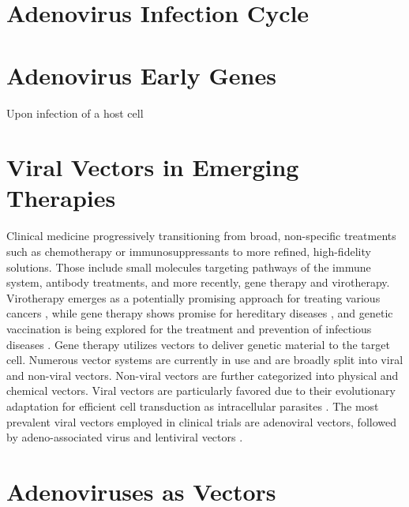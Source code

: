 \section{Adenovirus Infection Cycle}



\section{Adenovirus Early Genes}

Upon infection of a host cell


\section{Viral Vectors in Emerging Therapies}

Clinical medicine progressively transitioning from broad, non-specific treatments such as chemotherapy or immunosuppressants to more refined, high-fidelity solutions. Those include small molecules targeting pathways of the immune system, antibody treatments, and more recently, gene therapy and virotherapy. Virotherapy emerges as a potentially promising approach for treating various cancers \cite{xiaoOncolyticVirusesAdvanced2026}, while gene therapy shows promise for hereditary diseases \cite{shchaslyvyiCurrentStateHuman2023}, and genetic vaccination is being explored for the treatment and prevention of infectious diseases \cite{zhouDNABasedVaccinesAdvances2026}. Gene therapy utilizes vectors to deliver genetic material to the target cell. Numerous vector systems are currently in use and are broadly split into viral and non-viral vectors. Non-viral vectors are further categorized into physical and chemical vectors. Viral vectors are particularly favored due to their evolutionary adaptation for efficient cell transduction as intracellular parasites \cite{kajanVirusHostCoevolution2020}. The most prevalent viral vectors employed in clinical trials are adenoviral vectors, followed by adeno-associated virus and lentiviral vectors \cite{bulchaViralVectorPlatforms2021}.

\section{Adenoviruses as Vectors}

